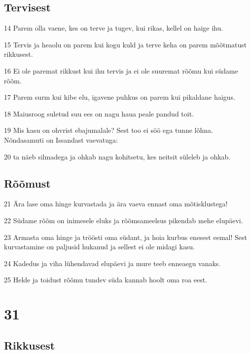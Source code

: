 \section*{Tervisest}

\par 14 Parem olla vaene, kes on terve ja tugev, kui rikas, kellel on haige ihu.
\par 15 Tervis ja heaolu on parem kui kogu kuld ja terve keha on parem mõõtmatust rikkusest.
\par 16 Ei ole paremat rikkust kui ihu tervis ja ei ole suuremat rõõmu kui südame rõõm.
\par 17 Parem surm kui kibe elu, igavene puhkus on parem kui pikaldane haigus.
\par 18 Maiusroog suletud suu ees on nagu haua peale pandud toit.
\par 19 Mis kasu on ohvrist ebajumalale? Sest too ei söö ega tunne lõhna. Nõndasamuti on Issandast vaevatuga:
\par 20 ta näeb silmadega ja ohkab nagu kohitsetu, kes neitsit süleleb ja ohkab.

\section*{Rõõmust}

\par 21 Ära lase oma hinge kurvastada ja ära vaeva ennast oma mõtisklustega!
\par 22 Südame rõõm on inimesele eluks ja rõõmsameelsus pikendab mehe elupäevi.
\par 23 Armasta oma hinge ja tröösti oma südant, ja hoia kurbus enesest eemal! Sest kurvastamine on paljusid hukanud ja sellest ei ole midagi kasu.
\par 24 Kadedus ja viha lühendavad elupäevi ja mure teeb enneaegu vanaks.
\par 25 Helde ja toidust rõõmu tundev süda kannab hoolt oma roa eest.

\chapter{31}

\section*{Rikkusest}

